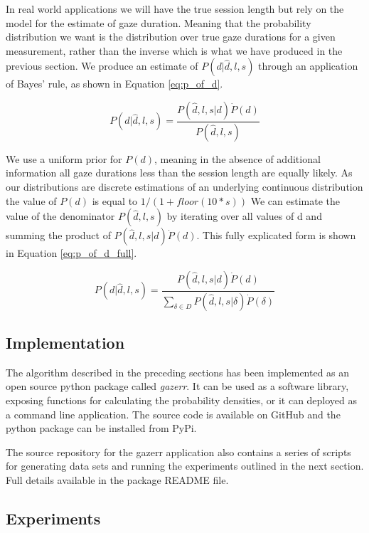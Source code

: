 \documentclass[12pt,a4paper]{article}
\numberwithin{equation}{section}
\begin{document}
In real world applications we will have the true session length but rely on the model for the 
estimate of gaze duration. Meaning that the probability distribution we want is the distribution 
over true gaze durations for a given measurement, rather than the inverse which is what we 
have produced in the previous section. We produce an estimate of $P(d|\hat{d},l,s)$
through an application of Bayes' rule, as shown in Equation \ref{eq:p_of_d}.

\begin{equation}
\label{eq:p_of_d}
P(d|\hat{d},l,s) =  \frac{ P(\hat{d},l,s|d) \dot P(d) }{ P(\hat{d},l,s)  }
\end{equation}

We use a uniform prior for $P(d)$, meaning in the absence of additional information all
gaze durations less than the session length are equally likely. As our distributions are
discrete estimations of an underlying continuous distribution the value of $P(d)$ is
equal to $1/(1+floor(10*s))$
 We can estimate the value
of the denominator $P(\hat{d},l,s)$ by iterating over all values of d and summing the product
of $ P(\hat{d},l,s|d) \dot P(d)$. This fully explicated form is shown in 
Equation \ref{eq:p_of_d_full}.

\begin{equation}
\label{eq:p_of_d_full}
P(d|\hat{d},l,s) =  \frac{ P(\hat{d},l,s|d) \dot P(d) }{ \sum_{\delta \in D} P(\hat{d},l,s|\delta) \dot P(\delta)  }
\end{equation}

\subsection{Implementation}

The algorithm described in the preceding sections has been implemented as an open source python 
package called \textit{gazerr}. 
It can be used as a software library, exposing functions for calculating the probability densities,
or it can deployed as a command line application. 
The source code is available on GitHub and the python package can be installed from PyPi.

The source repository for the gazerr application also contains a series of scripts for generating data
sets and running the experiments outlined in the next section. Full details available in the package
README file.

\subsection{Experiments}
\end{document}
